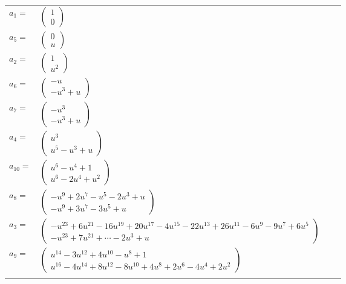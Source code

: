 \documentclass[1p]{elsarticle_modified}
\theoremstyle{definition}
\begin{document}
\begin{tabular}{m{7pt} m{180pt} m{7pt} m{180pt} }
\flushright $a_{1}=$&$\begin{pmatrix}1\\0\end{pmatrix}$ \\
\flushright $a_{5}=$&$\begin{pmatrix}0\\u\end{pmatrix}$ \\
\flushright $a_{2}=$&$\begin{pmatrix}1\\u^2\end{pmatrix}$ \\
\flushright $a_{6}=$&$\begin{pmatrix}- u\\- u^3+u\end{pmatrix}$ \\
\flushright $a_{7}=$&$\begin{pmatrix}- u^3\\- u^3+u\end{pmatrix}$ \\
\flushright $a_{4}=$&$\begin{pmatrix}u^3\\u^5- u^3+u\end{pmatrix}$ \\
\flushright $a_{10}=$&$\begin{pmatrix}u^6- u^4+1\\u^6-2 u^4+u^2\end{pmatrix}$ \\
\flushright $a_{8}=$&$\begin{pmatrix}- u^9+2 u^7- u^5-2 u^3+u\\- u^9+3 u^7-3 u^5+u\end{pmatrix}$ \\
\flushright $a_{3}=$&$\begin{pmatrix}- u^{23}+6 u^{21}-16 u^{19}+20 u^{17}-4 u^{15}-22 u^{13}+26 u^{11}-6 u^9-9 u^7+6 u^5\\- u^{23}+7 u^{21}+\cdots-2 u^3+u\end{pmatrix}$ \\
\flushright $a_{9}=$&$\begin{pmatrix}u^{14}-3 u^{12}+4 u^{10}- u^8+1\\u^{16}-4 u^{14}+8 u^{12}-8 u^{10}+4 u^8+2 u^6-4 u^4+2 u^2\end{pmatrix}$\\&\end{tabular}
\end{document}
